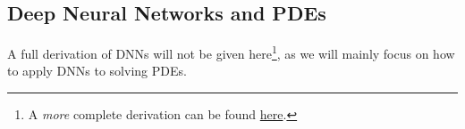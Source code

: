 \subsection{Deep Neural Networks and PDEs}
A full derivation of DNNs will not be given here\footnote{A \textit{more} complete derivation can be found \href{https://github.com/hmvege/StatML/blob/master/doc/backpropagation.pdf}{here}.}, as we will mainly focus on how to apply DNNs to solving PDEs.


